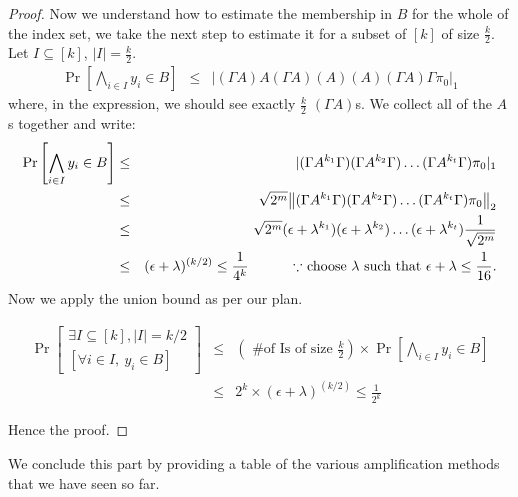 \begin{proof}
\noindent Now we understand how to estimate the membership in $B$ for the whole of the index set, we take the next step to estimate it for a subset of $[k]$ of size $\frac{k}{2}$. Let $I \subseteq [k]$, $|I|=\frac{k}{2}$.
\begin{eqnarray*}
\Pr\left[\bigwedge_{i \in I} y_i \in B\right] & \le & |(\Gamma A) A (\Gamma A) (A) (A) (\Gamma A) \Gamma \pi_0|_1
\end{eqnarray*}
where, in the expression, we should see exactly $\frac{k}{2}$ $(\Gamma A)$s. We collect all of the $A$s together and write:
\begin{eqnarray*}
\Pr\left[\bigwedge_{i \in I} y_i \in B\right] & \le & |(\Gamma A^{k_1} \Gamma) (\Gamma A^{k_2} \Gamma) \ldots (\Gamma A^{k_t} \Gamma) \pi_0|_1 \\
& \le & \sqrt{2^m}{\left\lVert(\Gamma A^{k_1} \Gamma) (\Gamma A^{k_2} \Gamma) \ldots (\Gamma A^{k_t} \Gamma) \pi_0\right\rVert}_2 \\
& \le & \sqrt{2^m}(\epsilon+\lambda^{k_1}) (\epsilon+\lambda^{k_2}) \ldots (\epsilon+\lambda^{k_t}) \frac{1}{\sqrt{2^m}} \\
& \le & (\epsilon+\lambda)^{(k/2)} \le \frac{1}{4^k} 
\textrm{\hspace{1cm} $\because$ choose $\lambda$ such that $\epsilon+\lambda \le \frac{1}{16}$.}
\end{eqnarray*}
\noindent Now we apply the union bound as per our plan.

\begin{eqnarray*}
\Pr\left[ \begin{array}{c}
\exists I \subseteq [k], |I|=k/2 \\
\left[ \forall i \in I,~y_i \in B \right]
\end{array}
\right] & \le & \left(\textrm{ \# of Is of size $\frac{k}{2}$}\right) \times  \Pr\left[\bigwedge_{i \in I} y_i \in B\right] \\
& \le & 2^k \times (\epsilon+\lambda)^{(k/2)} \le \frac{1}{2^k}
\end{eqnarray*}

Hence the proof.

\end{proof}

We conclude this part by providing a table of the various amplification methods that we have seen so far.


